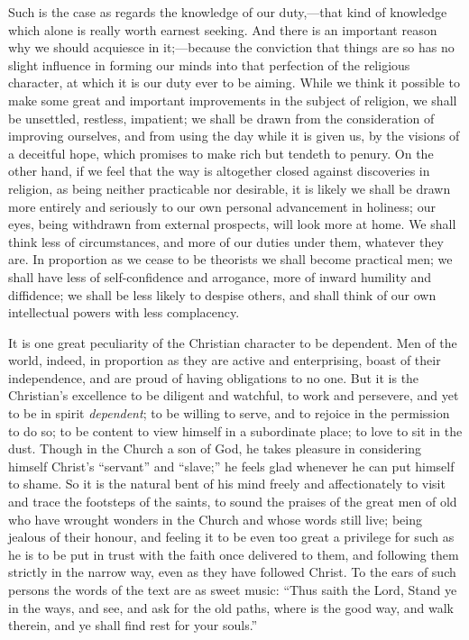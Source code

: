 Such is the case as regards the knowledge of our duty,—that kind
of knowledge which alone is really worth earnest seeking. And there is
an important reason why we should acquiesce in it;—because the
conviction that things are so has no slight influence in forming our
minds into that perfection of the religious character, at which it is
our duty ever to be aiming. While we think it possible to make some
great and important improvements in the subject of religion, we shall
be unsettled, restless, impatient; we shall be drawn from the
consideration of improving ourselves, and from using the day while it
is given us, by the visions of a deceitful hope, which promises to
make rich but tendeth to penury. On the other hand, if we feel that
the way is altogether closed against discoveries in religion, as being
neither practicable nor desirable, it is likely we shall be drawn more
entirely and seriously to our own personal advancement in holiness;
our eyes, being withdrawn from external prospects, will look more at
home. We shall think less of circumstances, and more of our duties
under them, whatever they are. In proportion as we cease to be
theorists we shall become practical men; we shall have less of
self-confidence and arrogance, more of inward humility and diffidence;
we shall be less likely to despise others, and shall think of our own
intellectual powers with less complacency.

It is one great peculiarity of the Christian character to be
dependent. Men of the world, indeed, in proportion as they are active
and enterprising, boast of their independence, and are proud of having
obligations to no one. But it is the Christian's excellence to be
diligent and watchful, to work and persevere, and yet to be in spirit \emph{dependent};
to be willing to serve, and to rejoice in the permission to do so; to
be content to view himself in a subordinate place; to love to sit in
the dust. Though in the Church a son of God, he takes pleasure in
considering himself Christ's ``servant'' and
``slave;'' he feels glad whenever he can put himself to shame.
So it is the natural bent of his mind freely and affectionately to
visit and trace the footsteps of the saints, to sound the praises of
the great men of old who have wrought wonders in the Church and whose
words still live; being jealous of their honour, and feeling it to be
even too great a privilege for such as he is to be put in trust with
the faith once delivered to them, and following them strictly in the
narrow way, even as they have followed Christ. To the ears of such
persons the words of the text are as sweet music: ``Thus saith the
Lord, Stand ye in the ways, and see, and ask for the old paths, where
is the good way, and walk therein, and ye shall find rest for your
souls.''

